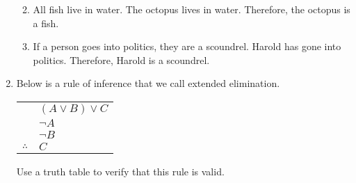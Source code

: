 \begin{enumerate}
\begin{enumerate}
  \wbvfill

\item All fish live in water. \newline
  The octopus lives in water. \newline
  Therefore, the octopus is a fish.
  
  \wbvfill

\item If a person goes into politics, they are a scoundrel.\newline
  Harold has gone into politics. \newline
  Therefore, Harold is a scoundrel. 
\end{enumerate}

\wbvfill

\workbookpagebreak

\item Below is a rule of inference that we call extended elimination.

\begin{tabular}{cl}
 & $(A \lor B) \lor C$ \\
 & ${\lnot}A$ \\
 & ${\lnot}B$ \\ \hline
$\therefore$ & $C$ \\
\end{tabular}

Use a truth table to verify that this rule is valid.

\end{enumerate}
